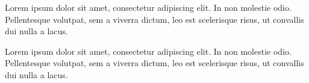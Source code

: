 

Lorem ipsum dolor sit amet, consectetur adipiscing elit. In non molestie odio. Pellentesque volutpat, sem a viverra dictum, leo est scelerisque risus, ut convallis dui nulla a lacus. 


Lorem ipsum dolor sit amet, consectetur adipiscing elit. In non molestie odio. Pellentesque volutpat, sem a viverra dictum, leo est scelerisque risus, ut convallis dui nulla a lacus. 



